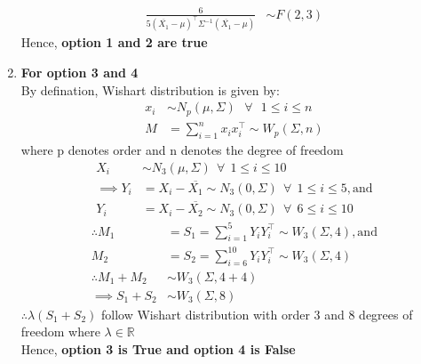 \documentclass[journal,12pt,twocolumn]{IEEEtran}
\theoremstyle{remark}
\begin{document}
\begin{enumerate}
\begin{align}
	\frac{6}{5(\overline{X_1}-\mu)^{\top}\Sigma^{-1}(\overline{X_1}-\mu)} &\sim F(2,3)
\end{align}
Hence, \textbf{option 1 and 2 are true}
\item \textbf{For option 3 and 4}\\
By defination, Wishart distribution is given by:
\begin{align}
	x_i &\sim N_p(\mu,\Sigma) \ \ \ \forall \ \ \ 1 \leq i \leq n\\
	M &= \sum_{i=1}^n x_ix_i^\top \sim W_p(\Sigma,n)
\end{align}
where p denotes order and n denotes the degree of freedom
\begin{align}
	X_i &\sim N_3(\mu,\Sigma) \ \ \forall \ \ 1\leq i\leq 10\\
	\implies Y_i &= X_i - \overline{X_1} \sim N_3(0,\Sigma) \ \ \forall\ \  1\leq i\leq 5, \text{and}\\
	Y_i &= X_i - \overline{X_2} \sim N_3(0,\Sigma) \ \ \forall\ \  6\leq i\leq 10
\end{align}
\begin{align}
	\therefore M_1 &= S_1 = \sum_{i=1}^{5}Y_iY_i^\top \sim W_{3}(\Sigma,4), \text{and}\\
	M_2 &= S_2 = \sum_{i=6}^{10}Y_iY_i^\top \sim W_{3}(\Sigma,4)\\
	\therefore M_1+M_2 &\sim W_3(\Sigma,4+4)\\
	\implies S_1+S_2 &\sim W_3(\Sigma,8)
\end{align}
		$\therefore \lambda(S_1+S_2)$ follow Wishart distribution with order 3 and 8 degrees of freedom where $\lambda \in \mathbb{R}$\\
Hence, \textbf{option 3 is True and option 4 is False}

\end{enumerate}
\end{document}
